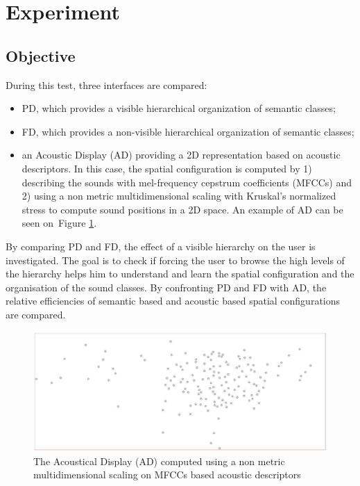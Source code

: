 \documentclass{aes2e}
\begin{document}
\section{Experiment} \label{test}

\subsection{Objective}
During this test, three interfaces are compared:
\begin{itemize}
\item PD, which provides a visible hierarchical organization of semantic classes;
\item FD, which provides a non-visible hierarchical organization of semantic classes;
\item an Acoustic Display (AD) providing a 2D representation based on acoustic descriptors. In this case, the spatial configuration is computed by 1) describing the sounds with mel-frequency cepstrum coefficients (MFCCs) and 2) using  a non metric multidimensional scaling with Kruskal's normalized stress to compute sound positions in a 2D space. An example of AD can be seen on~Figure \ref{figXP3}.
\end{itemize}

By comparing PD and FD, the effect of a visible hierarchy on the user is investigated. The goal is to check if forcing the user to browse the high levels of the hierarchy helps him to understand and learn the spatial configuration and the organisation of the sound classes. By confronting PD and FD with AD, the relative efficiencies of semantic based and acoustic based spatial configurations are compared. 

\begin{figure}[t]
\begin{center}
\includegraphics[scale=0.18]{gfx/XP3.pdf} 
\end{center}
\caption{\label{figXP3} The Acoustical Display (AD) computed using  a non metric multidimensional scaling on  MFCCs based acoustic descriptors}
\end{figure}
\end{document}
